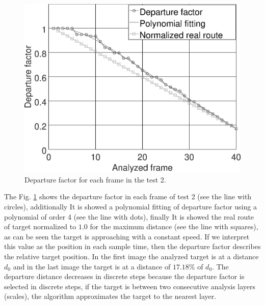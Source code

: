 \begin{figure}[H]
\includegraphics[width=\columnwidth]{images/grapha_b.eps}
\caption{Departure factor for each frame in the test 2.}
\label{fig:res_grapha_b}
\end{figure}

The Fig. \ref{fig:res_grapha_b} shows the departure factor in each frame
of test 2 (see the line with circles), additionally It is showed a polynomial
fitting of departure factor using a polynomial of order 4 (see the line with dots),
finally It is showed the real route of target normalized to $1.0$ for the maximum distance
(see the line with squares), as can be seen the target is approaching with a constant speed. 
If we interpret this value as the position in each sample time, 
then the departure factor describes the relative target position.
In the first image the analyzed target is at a distance $d_0$ 
and in the last image the target is at a distance of $17.18\%$ of $d_0$.
The departure distance decreases in discrete steps because the departure
factor is selected in discrete steps, if the target is
between two consecutive analysis layers (scales), the algorithm
approximates the target to the nearest layer.



